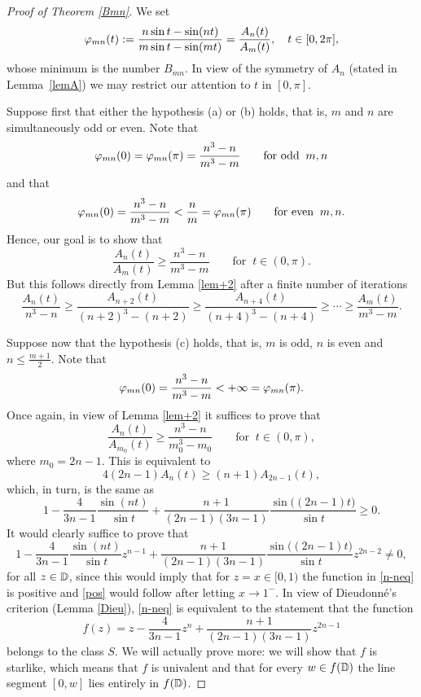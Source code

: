 \documentclass[11pt,reqno]{amsart}
\theoremstyle{plain}
\theoremstyle{definition}
\theoremstyle{remark}
\newcommand{\be}{\begin{equation}}
\newcommand{\ee}{\end{equation}}
\begin{document}
\begin{proof}[Proof of Theorem \ref{Bmn}]
We set 
$$
\varphi_{mn}(t) := \frac{n\sin t -\sin(nt)}{m\sin t -\sin(mt)} = \frac{A_n(t)}{A_m(t)}, \quad t\in[0,2\pi],
$$
whose minimum is the number $B_{mn}$. In view of the symmetry of $A_n$ (stated in Lemma~\ref{lemA}) we may restrict our attention to $t$ in $[0,\pi]$.

\vskip0.1cm
Suppose first that either the hypothesis (a) or (b) holds, that is, $m$ and $n$ are simultaneously odd or even. Note that 
$$
\varphi_{mn}(0) = \varphi_{mn}(\pi) = \frac{n^3-n}{m^3-m} \qquad \text{for odd} \;\; m,n
$$
and that 
$$
\varphi_{mn}(0) = \frac{n^3-n}{m^3-m} < \frac{n}{m} = \varphi_{mn}(\pi) \qquad \text{for even} \;\; m,n.
$$
Hence, our goal is to show that 
$$
\frac{A_n(t)}{A_m(t)} \geq \frac{n^3-n}{m^3-m} \qquad \text{for} \;\; t\in (0,\pi).
$$
But this follows directly from Lemma \ref{lem+2} after a finite number of iterations 
$$
\frac{A_n(t)}{n^3-n} \geq \frac{A_{n+2}(t)}{(n+2)^3-(n+2)} \geq \frac{A_{n+4}(t)}{(n+4)^3-(n+4)} \geq \cdots \geq \frac{A_m(t)}{m^3-m}.
$$

\vskip0.1cm
Suppose now that the hypothesis (c) holds, that is, $m$ is odd, $n$ is even and $n\leq \frac{m+1}{2}$. Note that 
$$
\varphi_{mn}(0) = \frac{n^3-n}{m^3-m} < +\infty = \varphi_{mn}(\pi).
$$
Once again, in view of Lemma \ref{lem+2} it suffices to prove that 
$$
\frac{A_n(t)}{A_{m_0}(t)} \geq \frac{n^3-n}{m_0^3-m_0} \qquad \text{for} \;\; t\in (0,\pi),
$$
where $m_0=2n-1$. This is equivalent to 
$$
4(2n-1)A_n(t) \geq (n+1)A_{2n-1}(t),
$$
which, in turn, is the same as 
\be \label{pos}
1- \frac{4}{3n-1} \frac{\sin(nt)}{\sin t} +\frac{n+1}{(2n-1)(3n-1)}\frac{\sin\big((2n-1)t\big)}{\sin t} \geq 0. 
\ee
It would clearly suffice to prove that 
\be \label{n-neq}
1- \frac{4}{3n-1} \frac{\sin(nt)}{\sin t} z^{n-1} +\frac{n+1}{(2n-1)(3n-1)}\frac{\sin\big((2n-1)t\big)}{\sin t}z^{2n-2}  \neq 0, 
\ee
for all $z\in{\mathbb D}$, since this would imply that for $z=x\in [0,1)$ the function in \eqref{n-neq} is positive and \eqref{pos} would follow after letting $x\to 1^-$. In view of Dieudonn\'e's criterion (Lemma \ref{Dieu}), \eqref{n-neq} is equivalent to the statement that the function
\be \label{Bran}
f(z) = z -\frac{4}{3n-1} z^n +\frac{n+1}{(2n-1)(3n-1)} z^{2n-1}
\ee
belongs to the class $S$. We will actually prove more: we will show that $f$ is starlike, which means that $f$ is univalent and that for every $w\in f({\mathbb D})$ the line segment $[0,w]$ lies entirely in $f({\mathbb D})$.


\end{proof}
\end{document}
